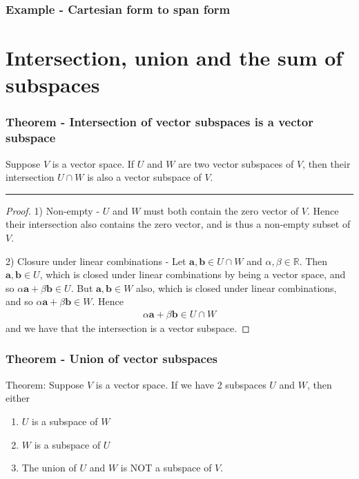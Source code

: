 \documentclass[usenames,dvipsnames,aspectratio=169,10pt]{beamer}
\numberwithin{equation}{section}
\begin{document}
\begin{frame}
\frametitle{Example - Cartesian form to span form}
\end{frame}
\fi



\section{Intersection, union and the sum of subspaces}



\begin{frame}
\frametitle{Theorem - Intersection of vector subspaces is a vector subspace}

Suppose $V$ is a vector space. If $U$ and $W$ are two vector subspaces of $V$, then their intersection $U \cap W$ is also a vector subspace of $V$.
\vspace{-0.3cm}\begin{center} \textcolor{airforceblue}{\rule{0.7\textwidth}{0.3mm}} \end{center}\vspace{-0.2cm}

\begin{proof}
1) Non-empty - $U$ and $W$ must both contain the zero vector of $V$. Hence their intersection also contains the zero vector, and is thus a non-empty subset of $V$.

2) Closure under linear combinations - Let $\textbf{a}, \textbf{b} \in U \cap W$ and $\alpha, \beta \in \mathbb{R}$. Then $\textbf{a}, \textbf{b} \in U$, which is closed under linear combinations by being a vector space, and so $\alpha\textbf{a}+\beta\textbf{b} \in U$. But $\textbf{a}, \textbf{b} \in W$ also, which is closed under linear combinations, and so $\alpha\textbf{a}+\beta\textbf{b} \in W$. Hence
\begin{align*}
\alpha\textbf{a}+\beta\textbf{b} \in U\cap W
\end{align*}
and we have that the intersection is a vector subspace.
\end{proof} 
\end{frame}


\begin{frame}
\frametitle{Theorem - Union of vector subspaces}

Theorem: Suppose $V$ is a vector space. If we have 2 subspaces $U$ and $W$, then either
\begin{enumerate}
\item $U$ is a subspace of $W$
\item $W$ is a subspace of $U$
\item The union of $U$ and $W$ is NOT a subspace of $V$.
\end{enumerate}

\end{frame}
\end{document}
